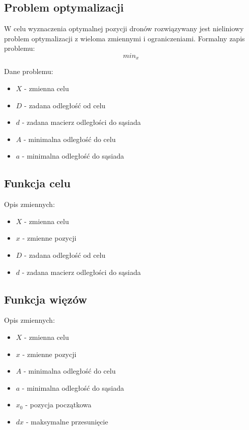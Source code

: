 \documentclass[a4paper, 11pt, oneside]{article}
\begin{document}
\subsection{Problem optymalizacji}
W celu wyznaczenia optymalnej pozycji dronów rozwiązywany jest nieliniowy problem optymalizacji z wieloma zmiennymi i ograniczeniami. Formalny zapis problemu:
\begin{equation}
min_{x}
\end{equation}


Dane problemu:
\begin{itemize}
\item $X$ - zmienna celu
\item $D$ - zadana odległość od celu
\item $d$ - zadana macierz odległości do sąsiada
\item $A$  - minimalna odległość do celu
\item $a$ -  minimalna odległość do sąsiada
\end{itemize}
\subsection{Funkcja celu}
Opis zmiennych:
\begin{itemize}
\item $X$ - zmienna celu
\item $x$ - zmienne pozycji 
\item $D$ - zadana odległość od celu
\item $d$ - zadana macierz odległości do sąsiada
\end{itemize}
\subsection{Funkcja więzów}
Opis zmiennych:
\begin{itemize}
\item $X$ - zmienna celu
\item $x$ - zmienne pozycji
\item $A$  - minimalna odległość do celu
\item $a$ -  minimalna odległość do sąsiada
\item $x_0$ - pozycja początkowa
\item $dx$ - maksymalne przesunięcie
\end{itemize}
\end{document}
